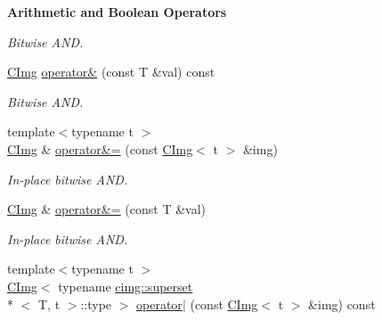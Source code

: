 \begin{Indent}{\bf Arithmetic and Boolean Operators}
\begin{DoxyCompactItemize}
\begin{DoxyCompactList}\small\item\em Bitwise A\-N\-D. \end{DoxyCompactList}\item 
\hypertarget{structcimg__library_1_1_c_img_a0b97c5531a68f17780c3bccfa1f1f2dc}{\hyperlink{structcimg__library_1_1_c_img}{C\-Img} \hyperlink{structcimg__library_1_1_c_img_a0b97c5531a68f17780c3bccfa1f1f2dc}{operator\&} (const T \&val) const }\label{structcimg__library_1_1_c_img_a0b97c5531a68f17780c3bccfa1f1f2dc}

\begin{DoxyCompactList}\small\item\em Bitwise A\-N\-D. \end{DoxyCompactList}\item 
\hypertarget{structcimg__library_1_1_c_img_a2cf250139e1ee8aa1a2a0e22d299bfa0}{{\footnotesize template$<$typename t $>$ }\\\hyperlink{structcimg__library_1_1_c_img}{C\-Img} \& \hyperlink{structcimg__library_1_1_c_img_a2cf250139e1ee8aa1a2a0e22d299bfa0}{operator\&=} (const \hyperlink{structcimg__library_1_1_c_img}{C\-Img}$<$ t $>$ \&img)}\label{structcimg__library_1_1_c_img_a2cf250139e1ee8aa1a2a0e22d299bfa0}

\begin{DoxyCompactList}\small\item\em In-\/place bitwise A\-N\-D. \end{DoxyCompactList}\item 
\hypertarget{structcimg__library_1_1_c_img_afc5a1bb8c474c74acbb1cccb0772b363}{\hyperlink{structcimg__library_1_1_c_img}{C\-Img} \& \hyperlink{structcimg__library_1_1_c_img_afc5a1bb8c474c74acbb1cccb0772b363}{operator\&=} (const T \&val)}\label{structcimg__library_1_1_c_img_afc5a1bb8c474c74acbb1cccb0772b363}

\begin{DoxyCompactList}\small\item\em In-\/place bitwise A\-N\-D. \end{DoxyCompactList}\item 
\hypertarget{structcimg__library_1_1_c_img_a69966fac63faf13053c232839d36d214}{{\footnotesize template$<$typename t $>$ }\\\hyperlink{structcimg__library_1_1_c_img}{C\-Img}$<$ typename \hyperlink{structcimg__library_1_1cimg_1_1superset}{cimg\-::superset}\\*
$<$ T, t $>$\-::type $>$ \hyperlink{structcimg__library_1_1_c_img_a69966fac63faf13053c232839d36d214}{operator$\vert$} (const \hyperlink{structcimg__library_1_1_c_img}{C\-Img}$<$ t $>$ \&img) const }\label{structcimg__library_1_1_c_img_a69966fac63faf13053c232839d36d214}


\end{DoxyCompactItemize}
\end{Indent}
